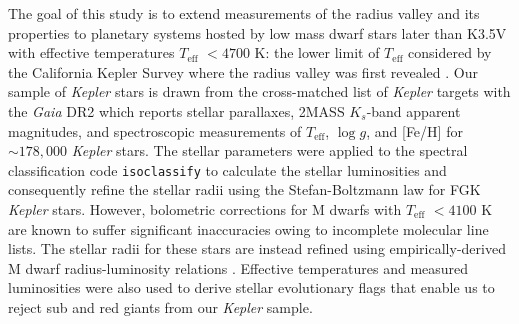 \documentclass[modern]{aastex63}
\newcommand\gaia{\emph{Gaia}}
\newcommand\kepler{\emph{Kepler}}
\newcommand\teff{$T_{\text{eff}}$}
\newcommand\logg{$\log{g}$}
\begin{document}
The goal of this study is to extend measurements of the radius valley and its properties to planetary systems
hosted by low mass dwarf stars later than K3.5V \citep{pecaut13} with effective temperatures \teff{} $<4700$ K:
the lower limit of \teff{} considered by the California Kepler Survey where the radius valley was first revealed
\cite{fulton17}.
Our sample of \kepler{} stars is drawn from the cross-matched list of \kepler{} targets with the \gaia{} DR2
\citep{berger18} which reports stellar parallaxes, 2MASS $K_s$-band apparent magnitudes, and spectroscopic
measurements of \teff{,} \logg{,} and [Fe/H] for $\sim 178,000$ \kepler{} stars.
The stellar parameters were applied to the spectral classification code \texttt{isoclassify} \citep{huber17} to
calculate the stellar luminosities and consequently refine the stellar radii using the Stefan-Boltzmann law for
FGK \kepler{} stars. 
However, bolometric corrections for M dwarfs with \teff{} $<4100$ K
are known to suffer significant inaccuracies owing to incomplete molecular line lists. The stellar radii for
these stars are instead refined using empirically-derived M dwarf radius-luminosity relations \citep{mann15}.
Effective temperatures and measured luminosities were also used to derive stellar evolutionary flags that enable
us to reject sub and red giants from our \kepler{} sample.
\end{document}
